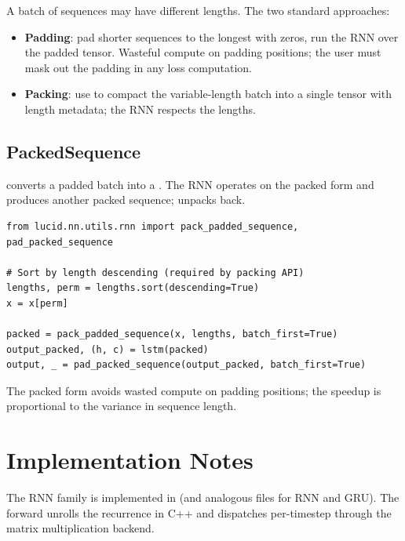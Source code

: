 A batch of sequences may have different lengths. The two standard
approaches:

\begin{itemize}
  \item \textbf{Padding}: pad shorter sequences to the longest
    with zeros, run the RNN over the padded tensor. Wasteful
    compute on padding positions; the user must mask out the
    padding in any loss computation.
  \item \textbf{Packing}: use  to compact
    the variable-length batch into a single tensor with length
    metadata; the RNN respects the lengths.
\end{itemize}

\subsection{PackedSequence}
\label{ssec:rnn_family:packed_sequence}

converts a padded batch into a . The RNN
operates on the packed form and produces another packed sequence;
 unpacks back.

\begin{lstlisting}[style=lucid,language=LucidPython]
from lucid.nn.utils.rnn import pack_padded_sequence, pad_packed_sequence

# Sort by length descending (required by packing API)
lengths, perm = lengths.sort(descending=True)
x = x[perm]

packed = pack_padded_sequence(x, lengths, batch_first=True)
output_packed, (h, c) = lstm(packed)
output, _ = pad_packed_sequence(output_packed, batch_first=True)
\end{lstlisting}

The packed form avoids wasted compute on padding positions; the
speedup is proportional to the variance in sequence length.

\section{Implementation Notes}
\label{sec:rnn_family:impl_notes}

The RNN family is implemented in  (and
analogous files for RNN and GRU). The forward unrolls the
recurrence in C++ and dispatches per-timestep through the matrix
multiplication backend.

